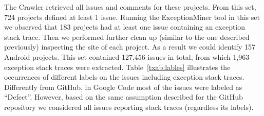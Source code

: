 \documentclass[conference]{IEEEtran}
\begin{document}
The Crawler retrieved all issues and comments for these projects.
From this set, 724 projects defined at least 1 issue. Running the ExceptionMiner tool 
 in this set we observed that 183 projects had at least one issue containing an exception stack trace.
 Then we performed further clean up (similar to the one described previously) inspecting the site 
of each project. As a result we could identify 157 Android projects.  This set contained  127,456 issues in total,
 from which 1,963 exception stack traces were extracted. Table~\ref{txab:lables} illustrates the occurrences of different labels 
on the issues including exception stack traces. Differently from GitHub, in Google Code most of 
the issues were labeled as ``Defect''. However, based on the same assumption described for the GitHub repository
 we considered all issues reporting stack traces (regardless its labels).




\end{document}
